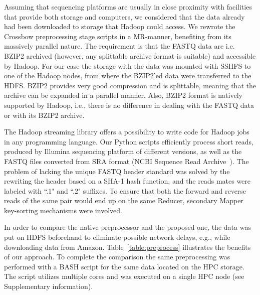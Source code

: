 \documentclass[10pt]{article}
\newcommand{\COMMENT}[1]{{\color{red} #1 }}
\newcommand{\COM}[1]{{\color{blue} #1 }}
\begin{document}

Assuming that sequencing platforms are usually in close proximity with facilities that provide both storage and computers, we considered that the data already had been downloaded to storage that Hadoop could access.
We rewrote the Crossbow preprocessing stage scripts in a MR-manner, benefiting from its massively parallel nature.
The requirement is that the FASTQ data are i.e. BZIP2 archived (however, any splittable archive format is suitable) and accessible by Hadoop. For our case the storage with the data was mounted with SSHFS to one of the Hadoop nodes, from where the BZIP2'ed data were transferred to the HDFS.
BZIP2 provides very good compression and is splittable, meaning that the archive can be expanded in a parallel manner. Also, BZIP2 format is natively supported by Hadoop, i.e., there is no difference in dealing with the FASTQ data or with its BZIP2 archive.


The Hadoop streaming library offers a possibility to write code for Hadoop jobs in any programming language. Our Python scripts efficiently process short reads, produced by Illumina sequencing platform of different versions, as well as the FASTQ files converted from SRA format (NCBI Sequence Read Archive~\cite{ncbi-sra}).
The problem of lacking the unique FASTQ header standard was solved by the rewriting the header based on a SHA-1 hash function, and the reads mates were labeled with ``.1" and ``.2" suffixes. 
To ensure that both the forward and reverse reads of the same pair would end up on the same Reducer, secondary Mapper key-sorting mechanisms were involved.

In order to compare the native preprocessor and the proposed one, the data was put on HDFS beforehand to eliminate possible network delays, e.g., while downloading data from Amazon.
Table~\ref{table:preprocess} illustrates the benefits of our approach.
To complete the comparison the same preprocessing was performed with a BASH script for the same data located on the HPC storage. The script utilizes multiple cores and was executed on a single HPC node (see Supplementary information).
\end{document}
